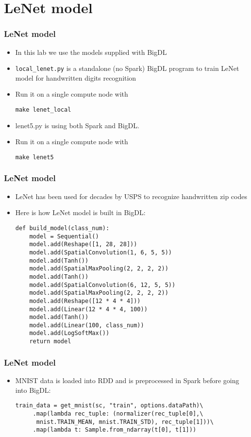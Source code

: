 \documentclass{beamer}
\begin{document}
\section{LeNet model}
\begin{frame}[fragile]
  \frametitle{LeNet model}
  \begin{itemize}
  \item In this lab we use the models supplied with BigDL
  \item {\color{mycolorcli}\verb|local_lenet.py|} is a standalone (no Spark) 
    BigDL program to train LeNet model for handwritten digits recognition
  \item Run it on a single compute node with
    {\color{mycolorcli}
\begin{verbatim}
make lenet_local
\end{verbatim}
    }
  \item {\color{mycolorcli}lenet5.py} is using both Spark and BigDL.
  \item Run it on a single compute node with
    {\color{mycolorcli}
\begin{verbatim}
make lenet5
\end{verbatim}
    }
\end{itemize}
\end{frame}


\begin{frame}[fragile]
  \frametitle{LeNet model}
  \begin{itemize}
  \item LeNet has been used for decades by USPS to recognize handwritten zip codes
  \item Here is how LeNet model is built in BigDL:
{\small
    {\color{mycolorcode}
\begin{verbatim}
def build_model(class_num):
    model = Sequential()
    model.add(Reshape([1, 28, 28]))
    model.add(SpatialConvolution(1, 6, 5, 5))
    model.add(Tanh())
    model.add(SpatialMaxPooling(2, 2, 2, 2))
    model.add(Tanh())
    model.add(SpatialConvolution(6, 12, 5, 5))
    model.add(SpatialMaxPooling(2, 2, 2, 2))
    model.add(Reshape([12 * 4 * 4]))
    model.add(Linear(12 * 4 * 4, 100))
    model.add(Tanh())
    model.add(Linear(100, class_num))
    model.add(LogSoftMax())
    return model
\end{verbatim}
    }
}
\end{itemize}
\end{frame}


\begin{frame}[fragile]
  \frametitle{LeNet model}
  \begin{itemize}
  \item MNIST data is loaded into RDD and is preprocessed in Spark before going into BigDL:
{\small
    {\color{mycolorcode}
\begin{verbatim}
train_data = get_mnist(sc, "train", options.dataPath)\
     .map(lambda rec_tuple: (normalizer(rec_tuple[0],\
      mnist.TRAIN_MEAN, mnist.TRAIN_STD), rec_tuple[1]))\
     .map(lambda t: Sample.from_ndarray(t[0], t[1]))
\end{verbatim}
}
}
\end{itemize}
\end{frame}
\end{document}
